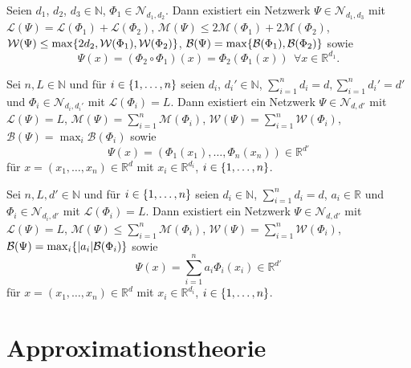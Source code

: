 \documentclass[11pt]{scrartcl}
\newcommand{\N}{\mathbb{N}} %
\newcommand{\R}{\mathbb{R}} %
\begin{document}
\begin{lemma}
    Seien \(d_1\), \(d_2\), \(d_3 \in \N\), \(\Phi_1 \in \mathcal{N}_{d_1, d_2}\). Dann existiert ein 
    Netzwerk \(\Psi \in \mathcal{N}_{d_1, d_3}\) mit \(\mathcal{L}(\Psi) = \mathcal{L}(\Phi_1) + \mathcal{L}(\Phi_2)\), 
    \(\mathcal{M}(\Psi) \leq 2 \mathcal{M}(\Phi_1) + 2\mathcal{M}(\Phi_2)\), \(\mathcal{W}(\Psi) \leq 
    \max\{2d_2, \mathcal{W}(\Phi_1), \mathcal{W}(\Phi_2)\}\), \(\mathcal{B}(\Psi) = \max\{\mathcal{B}(\Phi_1), \mathcal{B}(\Phi_2)\}\) 
    sowie
    \[ \Psi(x) = (\Phi_2 \circ \Phi_1)(x) = \Phi_2(\Phi_1(x)) \ \ \forall x\in \R^{d_1}. \]
\end{lemma}

\begin{lemma}
    Sei \(n, L \in\N\) und für \(i\in \{1,\ldots, n\}\) seien \(d_i\), \(d_i' \in \N\), \( \sum_{i=1}^n d_i = d, \sum_{i=1}^n d_i' = d'\)
    und \(\Phi_i \in \mathcal{N}_{d_i, d_i'}\) 
    mit \(\mathcal{L}(\Phi_i) = L\). Dann existiert ein Netzwerk \(\Psi \in \mathcal{N}_{d, d'}\) 
    mit \(\mathcal{L}(\Psi) = L\), \(\mathcal{M}(\Psi) = \sum_{i=1}^n \mathcal{M}(\Phi_i)\), 
    \(\mathcal{W}(\Psi) = \sum_{i=1}^n \mathcal{W}(\Phi_i)\), \(\mathcal{B}(\Psi) = \max_i \mathcal{B}(\Phi_i)\) sowie 
    \[ \Psi(x) = (\Phi_1(x_1), \ldots, \Phi_n(x_n)) \in \R^{d'} \]
    für \(x = (x_1, \ldots, x_n) \in \R^{d}\) mit \(x_i \in \R^{d_i}\), \(i\in \{1,\ldots, n\}\).
\end{lemma}

\begin{lemma}
    Sei \(n, L, d' \in\N\) und für \(i\in \{1,\ldots, n\}\) seien \(d_i \in \N\), \(\sum_{i=1}^n d_i = d\), \(a_i \in \R\) und \(\Phi_i \in \mathcal{N}_{d_i, d'}\) 
    mit \(\mathcal{L}(\Phi_i) = L\). Dann existiert ein Netzwerk \(\Psi \in \mathcal{N}_{d, d'}\) 
    mit \(\mathcal{L}(\Psi) = L\), \(\mathcal{M}(\Psi) \leq \sum_{i=1}^n \mathcal{M}(\Phi_i)\), 
    \(\mathcal{W}(\Psi) = \sum_{i=1}^n \mathcal{W}(\Phi_i)\), \(\mathcal{B}(\Psi) = \max_i \{|a_i| \mathcal{B}(\Phi_i)\}\) sowie 
    \[ \Psi(x) = \sum_{i=1}^n a_i \Phi_i(x_i) \in \R^{d'} \]
    für \(x = (x_1, \ldots, x_n) \in \R^{d}\) mit \(x_i \in \R^{d_i}\), \(i\in \{1,\ldots, n\}\).
\end{lemma}

\section{Approximationstheorie}
\end{document}
